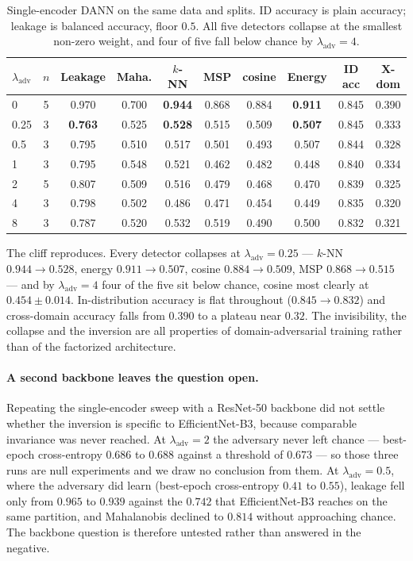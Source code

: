 \documentclass[11pt,a4paper]{article}
\newcommand{\lam}{\lambda_{\mathrm{adv}}}
\begin{document}
\begin{table}[t]
\centering
\small
\caption{Single-encoder DANN on the same data and splits. ID accuracy is plain accuracy;
leakage is balanced accuracy, floor $0.5$. All five detectors collapse at the smallest
non-zero weight, and four of five fall below chance by $\lam = 4$.}
\label{tab:single}
\begin{tabular}{lccccccccc}
\toprule
$\lam$ & $n$ & Leakage & Maha. & $k$-NN & MSP & cosine & Energy & ID acc & X-dom \\
\midrule
0    & 5 & 0.970 & 0.700 & \textbf{0.944} & 0.868 & 0.884 & \textbf{0.911} & 0.845 & 0.390 \\
0.25 & 3 & \textbf{0.763} & 0.525 & \textbf{0.528} & 0.515 & 0.509 & \textbf{0.507} & 0.845 & 0.333 \\
0.5  & 3 & 0.795 & 0.510 & 0.517 & 0.501 & 0.493 & 0.507 & 0.844 & 0.328 \\
1    & 3 & 0.795 & 0.548 & 0.521 & 0.462 & 0.482 & 0.448 & 0.840 & 0.334 \\
2    & 5 & 0.807 & 0.509 & 0.516 & 0.479 & 0.468 & 0.470 & 0.839 & 0.325 \\
4    & 3 & 0.798 & 0.502 & 0.486 & 0.471 & 0.454 & 0.449 & 0.835 & 0.320 \\
8    & 3 & 0.787 & 0.520 & 0.532 & 0.519 & 0.490 & 0.500 & 0.832 & 0.321 \\
\bottomrule
\end{tabular}
\end{table}

The cliff reproduces. Every detector collapses at $\lam = 0.25$ --- $k$-NN
$0.944 \to 0.528$, energy $0.911 \to 0.507$, cosine $0.884 \to 0.509$, MSP
$0.868 \to 0.515$ --- and by $\lam = 4$ four of the five sit below chance, cosine most
clearly at $0.454 \pm 0.014$. In-distribution accuracy is flat throughout
($0.845 \to 0.832$) and cross-domain accuracy falls from $0.390$ to a plateau near
$0.32$. The invisibility, the collapse and the inversion are all properties of
domain-adversarial training rather than of the factorized architecture.

\paragraph{A second backbone leaves the question open.} Repeating the single-encoder
sweep with a ResNet-50 backbone did not settle whether the inversion is specific to
EfficientNet-B3, because comparable invariance was never reached. At
$\lam = 2$ the adversary never left chance --- best-epoch cross-entropy $0.686$ to
$0.688$ against a threshold of $0.673$ --- so those three runs are null experiments and
we draw no conclusion from them. At $\lam = 0.5$, where the adversary did learn
(best-epoch cross-entropy $0.41$ to $0.55$), leakage fell only from $0.965$ to $0.939$
against the $0.742$ that EfficientNet-B3 reaches on the same partition, and Mahalanobis
declined to $0.814$ without approaching chance. The backbone question is therefore
untested rather than answered in the negative.
\end{document}
